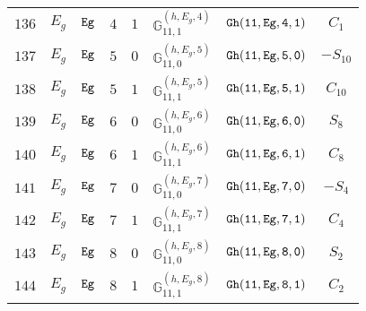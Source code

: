 \documentclass[fleqn,8pt]{jsarticle}
\begin{document}
\begin{table}[ht!]
\begin{center}
\begin{tabular}{cccccccc}
$ 136 $ & $ E_{g} $ & $ {\tt Eg} $ & $ 4 $ & $ 1 $ & $ \mathbb{G}_{11,1}^{(h,E_{g},4)} $ & $ {\tt Gh(11,Eg,4,1)} $ & $ C_{1} $ \\
$ 137 $ & $ E_{g} $ & $ {\tt Eg} $ & $ 5 $ & $ 0 $ & $ \mathbb{G}_{11,0}^{(h,E_{g},5)} $ & $ {\tt Gh(11,Eg,5,0)} $ & $ - S_{10} $ \\
$ 138 $ & $ E_{g} $ & $ {\tt Eg} $ & $ 5 $ & $ 1 $ & $ \mathbb{G}_{11,1}^{(h,E_{g},5)} $ & $ {\tt Gh(11,Eg,5,1)} $ & $ C_{10} $ \\
$ 139 $ & $ E_{g} $ & $ {\tt Eg} $ & $ 6 $ & $ 0 $ & $ \mathbb{G}_{11,0}^{(h,E_{g},6)} $ & $ {\tt Gh(11,Eg,6,0)} $ & $ S_{8} $ \\
$ 140 $ & $ E_{g} $ & $ {\tt Eg} $ & $ 6 $ & $ 1 $ & $ \mathbb{G}_{11,1}^{(h,E_{g},6)} $ & $ {\tt Gh(11,Eg,6,1)} $ & $ C_{8} $ \\
$ 141 $ & $ E_{g} $ & $ {\tt Eg} $ & $ 7 $ & $ 0 $ & $ \mathbb{G}_{11,0}^{(h,E_{g},7)} $ & $ {\tt Gh(11,Eg,7,0)} $ & $ - S_{4} $ \\
$ 142 $ & $ E_{g} $ & $ {\tt Eg} $ & $ 7 $ & $ 1 $ & $ \mathbb{G}_{11,1}^{(h,E_{g},7)} $ & $ {\tt Gh(11,Eg,7,1)} $ & $ C_{4} $ \\
$ 143 $ & $ E_{g} $ & $ {\tt Eg} $ & $ 8 $ & $ 0 $ & $ \mathbb{G}_{11,0}^{(h,E_{g},8)} $ & $ {\tt Gh(11,Eg,8,0)} $ & $ S_{2} $ \\
$ 144 $ & $ E_{g} $ & $ {\tt Eg} $ & $ 8 $ & $ 1 $ & $ \mathbb{G}_{11,1}^{(h,E_{g},8)} $ & $ {\tt Gh(11,Eg,8,1)} $ & $ C_{2} $ \\
 \hline \hline
\end{tabular}
\end{center}
\end{table}
\end{document}
